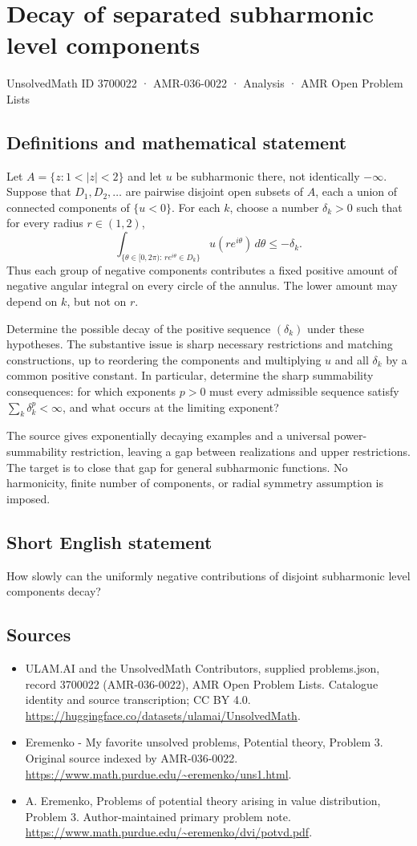 \documentclass[11pt,a4paper]{article}
\begin{document}
\section*{Decay of separated subharmonic level components}\label{3700022}
{\small UnsolvedMath ID 3700022 · AMR-036-0022 · Analysis · AMR Open Problem Lists}
\subsection{Definitions and mathematical statement}
Let $A=\{z:1<|z|<2\}$ and let $u$ be subharmonic
there, not identically $-\infty$. Suppose that
$D_1,D_2,\ldots$ are pairwise disjoint open subsets of $A$,
each a union of connected components of $\{u<0\}$.
For each $k$, choose a number $\delta_k>0$ such that
for every radius $r\in(1,2)$,
\[
 \int_{\{\theta\in[0,2\pi):\,re^{i\theta}\in D_k\}}
                      u(re^{i\theta})\,d\theta
                         \leq-\delta_k.
\]
Thus each group of negative components contributes a fixed
positive amount of negative angular integral on every circle
of the annulus. The lower amount may depend on $k$, but
not on $r$.

Determine the possible decay of the positive sequence
$(\delta_k)$ under these hypotheses. The substantive issue
is sharp necessary restrictions and matching constructions,
up to reordering the components and multiplying $u$ and
all $\delta_k$ by a common positive constant.
In particular, determine the sharp summability consequences:
for which exponents $p>0$ must every admissible sequence
satisfy $\sum_k\delta_k^p<\infty$, and what occurs at the
limiting exponent?

The source gives exponentially decaying examples and a
universal power-summability restriction, leaving a gap
between realizations and upper restrictions. The target is
to close that gap for general subharmonic functions.
No harmonicity, finite number of components, or radial
symmetry assumption is imposed.
\subsection{Short English statement}
How slowly can the uniformly negative contributions of disjoint subharmonic level components decay?
\subsection{Sources}
\begin{itemize}
\item[S1] ULAM.AI and the UnsolvedMath Contributors, supplied problems.json, record 3700022 (AMR-036-0022), AMR Open Problem Lists. Catalogue identity and source transcription; CC BY 4.0.
\url{https://huggingface.co/datasets/ulamai/UnsolvedMath}.
\item[S2] Eremenko - My favorite unsolved problems, Potential theory, Problem 3. Original source indexed by AMR-036-0022.
\url{https://www.math.purdue.edu/~eremenko/uns1.html}.
\item[S3] A. Eremenko, Problems of potential theory arising in value distribution, Problem 3. Author-maintained primary problem note.
\url{https://www.math.purdue.edu/~eremenko/dvi/potvd.pdf}.
\end{itemize}
\end{document}
